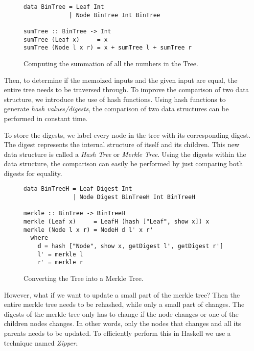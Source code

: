 \begin{figure}[H]
\captionsetup{justification=justified,singlelinecheck=false,margin=0cm}
\begin{verbatim}
data BinTree = Leaf Int
             | Node BinTree Int BinTree

sumTree :: BinTree -> Int
sumTree (Leaf x)     = x
sumTree (Node l x r) = x + sumTree l + sumTree r
\end{verbatim}
\caption{Computing the summation of all the numbers in the Tree.}
\label{fig-bin-tree}
\end{figure}

Then, to determine if the memoized inputs and the given input are equal, the entire tree needs to be traversed through. To improve the comparison of two data structure, we introduce the use of hash functions. Using hash functions to generate \textit{hash values/digests}, the comparison of two data structures can be performed in constant time.

To store the digests, we label every node in the tree with its corresponding digest. The digest represents the internal structure of itself and its children. This new data structure is called a \textit{Hash Tree} or \textit{Merkle Tree}\cite{merkle1987digital}. Using the digests within the data structure, the comparison can easily be performed by just comparing both digests for equality.

\begin{figure}[H]
\captionsetup{justification=justified,singlelinecheck=false,margin=0cm}
\begin{verbatim}
data BinTreeH = Leaf Digest Int
              | Node Digest BinTreeH Int BinTreeH

merkle :: BinTree -> BinTreeH
merkle (Leaf x)     = LeafH (hash ["Leaf", show x]) x
merkle (Node l x r) = NodeH d l' x r'
  where
    d = hash ["Node", show x, getDigest l', getDigest r']
    l' = merkle l
    r' = merkle r
\end{verbatim}
\caption{Converting the Tree into a Merkle Tree.}
\label{fig-conv-tree}
\end{figure}

However, what if we want to update a small part of the merkle tree? Then the entire merkle tree needs to be rehashed, while only a small part of changes. The digests of the merkle tree only has to change if the node changes or one of the children nodes changes. In other words, only the nodes that changes and all its parents needs to be updated. To efficiently perform this in Haskell we use a technique named \textit{Zipper}\cite{huet1997zipper}.  

